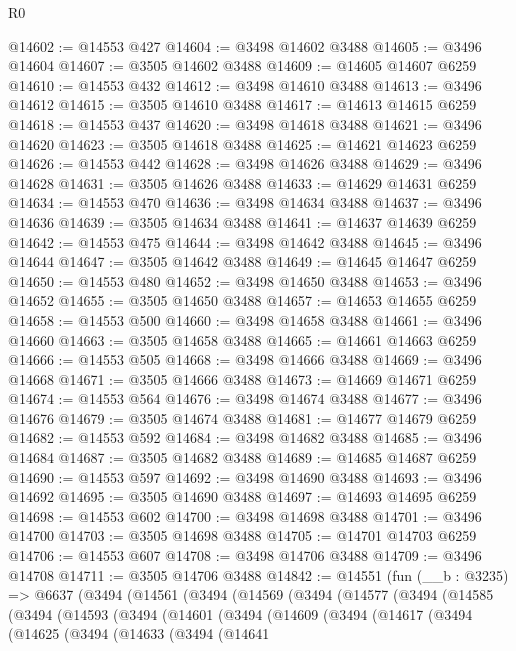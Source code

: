\begin{lexlean}{R0}
\begin{coremodule}
@14602 := @14553 @427
@14604 := @3498 @14602 @3488
@14605 := @3496 @14604
@14607 := @3505 @14602 @3488
@14609 := @14605 @14607 @6259
@14610 := @14553 @432
@14612 := @3498 @14610 @3488
@14613 := @3496 @14612
@14615 := @3505 @14610 @3488
@14617 := @14613 @14615 @6259
@14618 := @14553 @437
@14620 := @3498 @14618 @3488
@14621 := @3496 @14620
@14623 := @3505 @14618 @3488
@14625 := @14621 @14623 @6259
@14626 := @14553 @442
@14628 := @3498 @14626 @3488
@14629 := @3496 @14628
@14631 := @3505 @14626 @3488
@14633 := @14629 @14631 @6259
@14634 := @14553 @470
@14636 := @3498 @14634 @3488
@14637 := @3496 @14636
@14639 := @3505 @14634 @3488
@14641 := @14637 @14639 @6259
@14642 := @14553 @475
@14644 := @3498 @14642 @3488
@14645 := @3496 @14644
@14647 := @3505 @14642 @3488
@14649 := @14645 @14647 @6259
@14650 := @14553 @480
@14652 := @3498 @14650 @3488
@14653 := @3496 @14652
@14655 := @3505 @14650 @3488
@14657 := @14653 @14655 @6259
@14658 := @14553 @500
@14660 := @3498 @14658 @3488
@14661 := @3496 @14660
@14663 := @3505 @14658 @3488
@14665 := @14661 @14663 @6259
@14666 := @14553 @505
@14668 := @3498 @14666 @3488
@14669 := @3496 @14668
@14671 := @3505 @14666 @3488
@14673 := @14669 @14671 @6259
@14674 := @14553 @564
@14676 := @3498 @14674 @3488
@14677 := @3496 @14676
@14679 := @3505 @14674 @3488
@14681 := @14677 @14679 @6259
@14682 := @14553 @592
@14684 := @3498 @14682 @3488
@14685 := @3496 @14684
@14687 := @3505 @14682 @3488
@14689 := @14685 @14687 @6259
@14690 := @14553 @597
@14692 := @3498 @14690 @3488
@14693 := @3496 @14692
@14695 := @3505 @14690 @3488
@14697 := @14693 @14695 @6259
@14698 := @14553 @602
@14700 := @3498 @14698 @3488
@14701 := @3496 @14700
@14703 := @3505 @14698 @3488
@14705 := @14701 @14703 @6259
@14706 := @14553 @607
@14708 := @3498 @14706 @3488
@14709 := @3496 @14708
@14711 := @3505 @14706 @3488
@14842 := @14551
    (fun (__b : @3235) =>
    @6637
      (@3494
        (@14561
          (@3494
            (@14569
              (@3494
                (@14577
                  (@3494
                    (@14585
                      (@3494
                        (@14593
                          (@3494
                            (@14601
                              (@3494
                                (@14609
                                  (@3494
                                    (@14617
                                      (@3494
                                        (@14625
                                          (@3494
                                            (@14633
                                              (@3494
                                                (@14641

\end{coremodule}
\end{lexlean}
